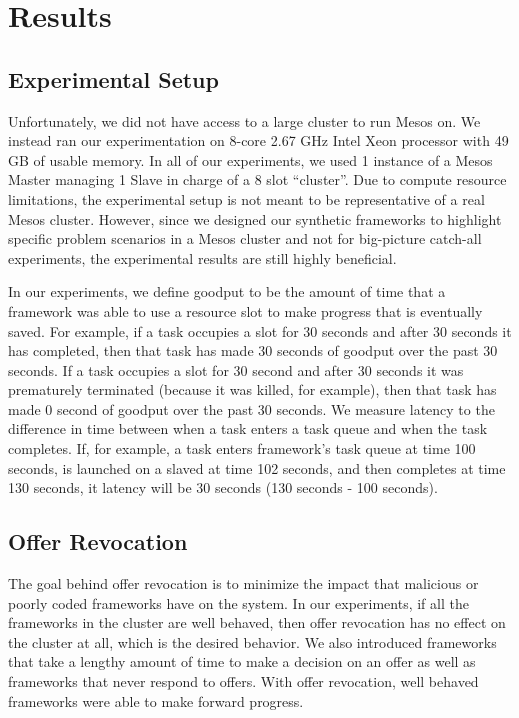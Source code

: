 \section{Results}
\label{sec:results}



\subsection{Experimental Setup}
Unfortunately, we did not have access to a large cluster to run Mesos on. We instead ran our
experimentation on 8-core 2.67 GHz Intel Xeon processor with 49 GB of usable memory. In all of our
experiments, we used 1 instance of a Mesos Master managing 1 Slave in charge of a 8 slot ``cluster''.
Due to compute resource limitations, the experimental setup is not meant to be representative of a real
Mesos cluster. However, since we designed our synthetic frameworks to highlight specific problem 
scenarios in a Mesos cluster and not for big-picture catch-all experiments, the experimental results
are still highly beneficial.

In our experiments, we define goodput to be the amount of time that a framework was able to use a
resource slot to make progress that is eventually saved. For example, if a task occupies a slot for
30 seconds and after 30 seconds it has completed, then that task has made 30 seconds of goodput over
the past 30 seconds. If a task occupies a slot for 30 second and after 30 seconds it was prematurely
terminated (because it was killed, for example), then that task has made 0 second of goodput over the
past 30 seconds. We measure latency to the difference in time between when a task enters a task queue
and when the task completes. If, for example, a task enters framework's task queue at time 100 seconds,
is launched on a slaved at time 102 seconds, and then completes at time 130 seconds, it latency will be
30 seconds (130 seconds - 100 seconds). 

\subsection{Offer Revocation}
The goal behind offer revocation is to minimize the impact that malicious or poorly coded frameworks
have on the system. In our experiments, if all the frameworks in the cluster are well behaved, then
offer revocation has no effect on the cluster at all, which is the desired behavior. We also introduced
frameworks that take a lengthy amount of time to make a decision on an offer as well as frameworks that
never respond to offers. With offer revocation, well behaved frameworks were able to make forward
progress.

